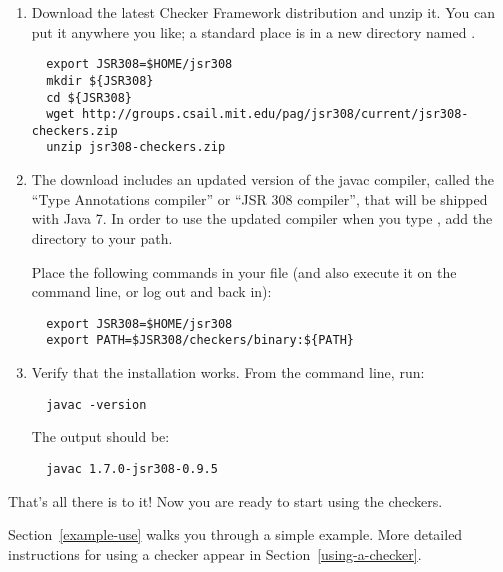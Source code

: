 \begin{enumerate}

\item
  Download the latest Checker Framework distribution
  and unzip it.  You can put it anywhere you like; a standard place is in a
  new directory named .

\begin{Verbatim}
  export JSR308=$HOME/jsr308
  mkdir ${JSR308}
  cd ${JSR308}
  wget http://groups.csail.mit.edu/pag/jsr308/current/jsr308-checkers.zip
  unzip jsr308-checkers.zip
\end{Verbatim}

\item
  The download includes an updated version of the javac compiler, called
  the ``Type Annotations compiler'' or ``JSR 308 compiler'', that will be
  shipped with Java 7.  In order to use the updated compiler when you type
  , add the directory  to your path.

  Place the following commands in your  file (and also execute
  it on the command line, or log out and back in):
\begin{Verbatim}
  export JSR308=$HOME/jsr308
  export PATH=$JSR308/checkers/binary:${PATH}
\end{Verbatim}



\item
  Verify that the installation works.  From the command line, run:

\begin{Verbatim}
  javac -version
\end{Verbatim}

The output should be:

\begin{Verbatim}
  javac 1.7.0-jsr308-0.9.5
\end{Verbatim}

\end{enumerate}

That's all there is to it!  Now you are ready to start using the checkers.

Section~\ref{example-use} walks you through a simple example.  More detailed
instructions for using a checker appear in Section~\ref{using-a-checker}.


